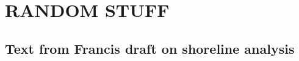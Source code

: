 \documentclass[11pt,letterpaper]{article}
\begin{document}
\clearpage
\newpage
\footnotesize

\section*{RANDOM STUFF}

\subsection*{Text from Francis draft on shoreline analysis}

\singlespacing



\end{document}
